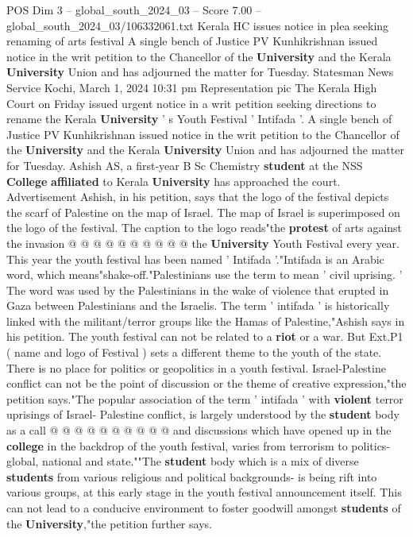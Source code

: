 \begin{textsample}{POS Dim 3 – global\_south\_2024\_03 – Score 7.00 – global\_south\_2024\_03/106332061.txt}  \label{ex:f3_pos_414}
Kerala HC issues notice in plea seeking renaming of arts festival A single bench of Justice PV Kunhikrishnan issued notice in the writ petition to the Chancellor of the \textbf{University} and the Kerala \textbf{University} Union and has adjourned the matter for Tuesday.
Statesman News Service Kochi, March 1, 2024 10:31 pm Representation pic The Kerala High Court on Friday issued urgent notice in a writ petition seeking directions to rename the Kerala \textbf{University} ' s Youth Festival ' Intifada '.
A single bench of Justice PV Kunhikrishnan issued notice in the writ petition to the Chancellor of the \textbf{University} and the Kerala \textbf{University} Union and has adjourned the matter for Tuesday.
Ashish AS, a first-year B Sc Chemistry \textbf{student} at the NSS \textbf{College} \textbf{affiliated} to Kerala \textbf{University} has approached the court.
Advertisement Ashish, in his petition, says that the logo of the festival depicts the scarf of Palestine on the map of Israel.
The map of Israel is superimposed on the logo of the festival.
The caption to the logo reads"the \textbf{protest} of arts against the invasion @ @ @ @ @ @ @ @ @ @ the \textbf{University} Youth Festival every year.
This year the youth festival has been named ' Intifada '."Intifada is an Arabic word, which means"shake-off."Palestinians use the term to mean ' civil uprising. ' The word was used by the Palestinians in the wake of violence that erupted in Gaza between Palestinians and the Israelis.
The term ' intifada ' is historically linked with the militant/terror groups like the Hamas of Palestine,"Ashish says in his petition.
The youth festival can not be related to a \textbf{riot} or a war.
But Ext.P1 ( name and logo of Festival ) sets a different theme to the youth of the state.
There is no place for politics or geopolitics in a youth festival.
Israel-Palestine conflict can not be the point of discussion or the theme of creative expression,"the petition says."The popular association of the term ' intifada ' with \textbf{violent} terror uprisings of Israel- Palestine conflict, is largely understood by the \textbf{student} body as a call @ @ @ @ @ @ @ @ @ @ and discussions which have opened up in the \textbf{college} in the backdrop of the youth festival, varies from terrorism to politics- global, national and state.""The \textbf{student} body which is a mix of diverse \textbf{students} from various religious and political backgrounds- is being rift into various groups, at this early stage in the youth festival announcement itself.
This can not lead to a conducive environment to foster goodwill amongst \textbf{students} of the \textbf{University},"the petition further says.

\end{textsample}
